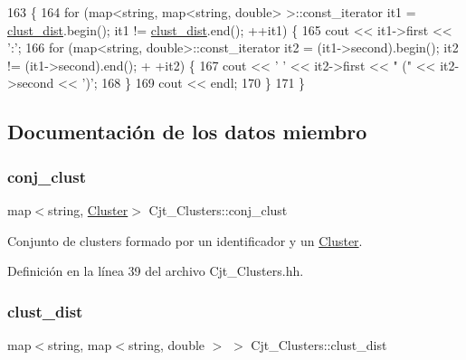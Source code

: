 \begin{DoxyCode}
163 \{
164     \textcolor{keywordflow}{for} (map<\textcolor{keywordtype}{string}, map<string, double> >::const\_iterator it1 = \hyperlink{class_cjt___clusters_a2e0931084578a4abb26d17bf289628d2}{clust\_dist}.begin(); it1 != 
      \hyperlink{class_cjt___clusters_a2e0931084578a4abb26d17bf289628d2}{clust\_dist}.end(); ++it1) \{
165         cout << it1->first << \textcolor{charliteral}{':'};
166         \textcolor{keywordflow}{for} (map<string, double>::const\_iterator it2 = (it1->second).begin(); it2 != (it1->second).end(); +
      +it2) \{
167             cout << \textcolor{charliteral}{' '} << it2->first << \textcolor{stringliteral}{" ("} << it2->second << \textcolor{charliteral}{')'};
168         \}
169         cout << endl;
170     \}
171 \}
\end{DoxyCode}


\subsection{Documentación de los datos miembro}
\mbox{\label{class_cjt___clusters_a1202e93aafa953b2dc9a76d03f056b08}} 
\subsubsection{\texorpdfstring{conj\+\_\+clust}{conj\_clust}}
{\footnotesize\ttfamily map$<$string, \hyperlink{class_cluster}{Cluster}$>$ Cjt\+\_\+\+Clusters\+::conj\+\_\+clust\hspace{0.3cm}{\ttfamily [private]}}



Conjunto de clusters formado por un identificador y un \hyperlink{class_cluster}{Cluster}. 



Definición en la línea 39 del archivo Cjt\+\_\+\+Clusters.\+hh.

\mbox{\label{class_cjt___clusters_a2e0931084578a4abb26d17bf289628d2}} 
\subsubsection{\texorpdfstring{clust\+\_\+dist}{clust\_dist}}
{\footnotesize\ttfamily map$<$string, map$<$string, double $>$ $>$ Cjt\+\_\+\+Clusters\+::clust\+\_\+dist\hspace{0.3cm}{\ttfamily [private]}}




